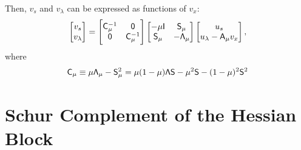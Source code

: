 Then, $v_s$ and $v_\lambda$ can be expressed as functions of $v_x$:
\begin{equation}\label{eq:vs_and_vlam}
  \begin{bmatrix} v_s \\ v_\lambda \end{bmatrix}
  =
  \begin{bmatrix}
    \mathsf{C}_\mu^{-1} & \mathsf{0} \\
    \mathsf{0} & \mathsf{C}_\mu^{-1}
  \end{bmatrix}
  \begin{bmatrix}
    -\mu \mathsf{I} & \mathsf{S}_\mu \\
    \mathsf{S}_\mu & -\mathsf{\Lambda}_\mu 
  \end{bmatrix}
  \begin{bmatrix} u_s \\ u_\lambda - \mathsf{A}_\mu v_x \end{bmatrix},
\end{equation}
where 
\begin{equation*}
  \mathsf{C}_{\mu} \equiv \mu \mathsf{\Lambda}_\mu - \mathsf{S}_\mu^2
  = \mu (1-\mu) \mathsf{\Lambda} \mathsf{S}- \mu^2 \mathsf{S} - (1-\mu)^2 \mathsf{S}^2
\end{equation*}







\section{Schur Complement of the Hessian Block}

